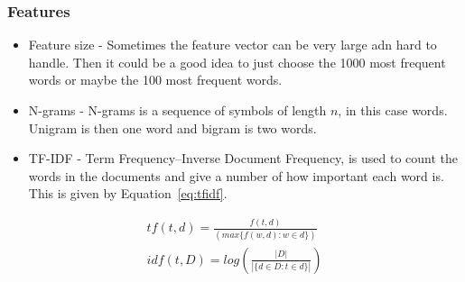 \subsubsection{Features}
\begin{itemize}
\item Feature size - Sometimes the feature vector can be very large adn hard to handle. Then it could be a good idea to just choose the 1000 most frequent words or maybe the 100 most frequent words. \citep{joachims}
\item N-grams - N-grams is a sequence of symbols of length $n$, in this case words. Unigram is then one word and bigram is two words. \citep{ngrams_ai}
\item TF-IDF - Term Frequency–Inverse Document Frequency, is used to count the words in the documents and give a number of how important each word is. This is given by Equation~\ref{eq:tfidf}.
\end{itemize}

\begin{equation}
\begin{array}{l}
tf(t,d) = \frac{f(t,d)}{(max \{f(w,d) : w \in d\})} \\
idf(t,D) = log(\frac{|D|}{|\{d \in D : t \in d\}|})
\end{array}
\label{eq:tfidf}
\end{equation}

